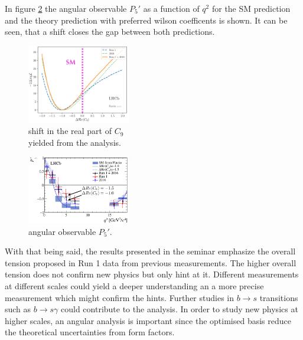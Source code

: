 In figure \ref{fig:shift} the angular observable $P_5\prime$ as a function of $q^2$ for the SM prediction and the theory prediction with preferred wilson coefficents is shown. It can be seen, that a shift closes the gap between both predictions.
\begin{figure}
  \centering
  \includegraphics[width=0.4\textwidth]{flavor_plots/shift_min.png}
  \caption{shift in the real part of $C_9$ \\
  yielded from the analysis.}
  \label{fig:shift_min}
\end{figure}
\begin{figure}
  \centering
  \includegraphics[width=0.4\textwidth]{flavor_plots/shift.png}
  \caption{angular observable $P_5\prime$.}
  \label{fig:shift}
\end{figure}

With that being said, the results presented in the seminar emphasize the overall tension proposed in Run 1 data from previous measurements.
The higher overall tension does not confirm new physics but only hint at it. Different measurements at different scales could yield a deeper understanding an a more precise measurement which might confirm the hints. Further studies in $b \to s$ transitions such as $b \to s \gamma$ could contribute to the analysis\cite{semilep}.
In order to study new physics at higher scales, an angular analysis is important since the optimised basis reduce the theoretical uncertainties from form factors.

\printbibliography{}

